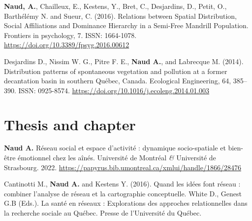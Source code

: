 \documentclass{resume}
\begin{document}
\begin{content}
	\publi
	{\textbf{Naud, A.}, Chailleux, E., Kestens, Y., Bret, C., Desjardins, D., Petit, O., Barthélémy N. and Sueur, C. (2016). Relations between Spatial Distribution, Social Affiliations and Dominance Hierarchy in a Semi-Free Mandrill Population. Frontiers in psychology, 7. ISSN: 1664-1078.
	\href{https://doi.org/10.3389/fpsyg.2016.00612}{https://doi.org/10.3389/fpsyg.2016.00612}} 


	\publi
	{Desjardins D., Nissim W. G., Pitre F. E., \textbf{Naud A.}, and Labrecque M. (2014). Distribution patterns of spontaneous vegetation and pollution at a former decantation basin in southern Québec, Canada. Ecological Engineering, 64, 385–390. ISSN: 0925-8574. \href{https://doi.org/10.1016/j.ecoleng.2014.01.003}{https://doi.org/10.1016/j.ecoleng.2014.01.003}}
\end{content}

\section{Thesis and chapter}
\begin{content}
	
	\publi
	{\textbf{Naud A.} Réseau social et espace d’activité : dynamique socio-spatiale et bien-être émotionnel chez les aînés. Université de Montréal {\em\&} Université de Strasbourg. 2022. \href{https://papyrus.bib.umontreal.ca/xmlui/handle/1866/28476}{https://papyrus.bib.umontreal.ca/xmlui/handle/1866/28476}}
	
	\publi
	{Cantinotti M., \textbf{Naud A.} and Kestens Y. (2016). Quand les idées font réseau : combiner l’analyse de réseau et la cartographie conceptuelle. White D., Genest G.B (Eds.). La santé en réseaux : Explorations des approches relationnelles dans la recherche sociale au Québec. Presse de l’Université du Québec.}

\end{content}

\end{document}
